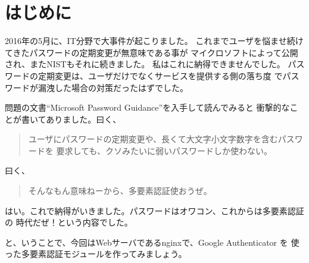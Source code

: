 \chapter*{はじめに}

2016年の5月に、IT分野で大事件が起こりました。
これまでユーザを悩ませ続けてきたパスワードの定期変更が無意味である事が
マイクロソフトによって公開され\cite{MS}、またNISTもそれに続きました。
私はこれに納得できませんでした。
パスワードの定期変更は、ユーザだけでなくサービスを提供する側の落ち度
でパスワードが漏洩した場合の対策だったはずでした。

問題の文書``Microsoft Password Guidance''を入手して読んでみると
衝撃的なことが書いてありました。曰く、
\begin{quote}
ユーザにパスワードの定期変更や、長くて大文字小文字数字を含むパスワードを
要求しても、クソみたいに弱いパスワードしか使わない。
\end{quote}
曰く、
\begin{quote}
そんなもん意味ねーから、多要素認証使おうぜ。
\end{quote}

はい。これで納得がいきました。パスワードはオワコン、これからは多要素認証の
時代だぜ！という内容でした。

と、いうことで、今回はWebサーバであるnginxで、Google Authenticator を
使った多要素認証モジュールを作ってみましょう。
